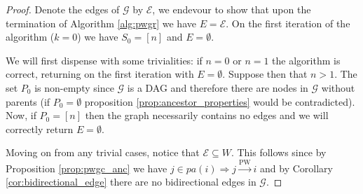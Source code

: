 \documentclass[12pt]{article}
\def\pwgc{\overset{\text{PW}}{\rightarrow}}  %
\def\gcg{\mathcal{G}}  %
\newcommand{\pa}[1]{pa(#1)}  %
\newcommand{\dist}[2]{\mathsf{d}(#1, #2)}  %
\begin{document}
\begin{proof}
  Denote the edges of $\gcg$ by $\mathcal{E}$, we endevour to show
  that upon the termination of Algorithm \ref{alg:pwgr} we have
  $E = \mathcal{E}$.  On the first iteration of the algorithm
  ($k = 0$) we have $S_0 = [n]$ and $E = \emptyset$.

  We will first dispense with some trivialities: if $n = 0$ or $n = 1$
  the algorithm is correct, returning on the first iteration with
  $E = \emptyset$.  Suppose then that $n > 1$.  The set
  $P_0$ is non-empty since $\gcg$ is a DAG and therefore
  there are nodes in $\gcg$ without parents (if
  $P_0 = \emptyset$ proposition
  \ref{prop:ancestor_properties} would be contradicted).  Now, if
  $P_0 = [n]$ then the graph necessarily contains no edges
  and we will correctly return $E = \emptyset$.

  Moving on from any trivial cases, notice that
  $\mathcal{E} \subseteq W$.  This follows since by Proposition
  \ref{prop:pwgc_anc} we have $j \in \pa{i} \Rightarrow j \pwgc i$ and by
  Corollary \ref{cor:bidirectional_edge} there are no bidirectional
  edges in $\gcg$.





  


\end{proof}
\end{document}
